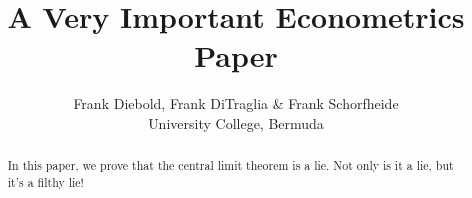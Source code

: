 \documentclass[12pt,letterpaper]{article}
\title{A Very Important Econometrics Paper}
\author{Frank Diebold, Frank DiTraglia & Frank Schorfheide \\ University College, Bermuda}
\begin{document}
\maketitle

\begin{abstract}
	In this paper, we prove that the central limit theorem is a lie. 
	Not only is it a lie, but it's a filthy lie!
\end{abstract}
\end{document}
